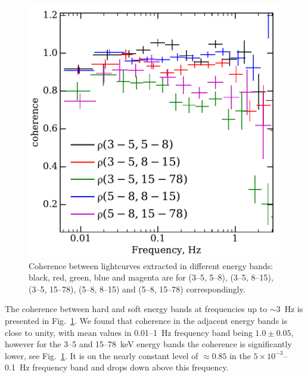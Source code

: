 \documentclass[a4paper,fleqn,usenatbib]{mnras}
\begin{document}
\begin{figure}
    \includegraphics[width=\columnwidth]{coherence_5.pdf}
    \caption{Coherence between lightcurves extracted in different energy bands: black, red, green, blue and magenta are for (3--5, 5--8), (3--5, 8--15), (3--5, 15--78), (5--8, 8--15) and (5--8, 15--78) correspondingly.}
    \label{fig:coherence}
\end{figure}

The coherence between hard and soft energy bands at frequencies up to $\sim3$~Hz is presented in Fig.~\ref{fig:coherence}. 
We found that coherence in the adjacent energy bands is close to unity, with mean values in 0.01--1~Hz frequency band being $1.0\pm0.05$, however for the 3--5 and 15--78~keV energy bands the coherence is significantly lower, see Fig.~\ref{fig:coherence}. 
It is on the nearly constant level of $\approx0.85$ in the $5\times10^{-3}$--0.1~Hz frequency band and drops down above this frequency.
\end{document}
